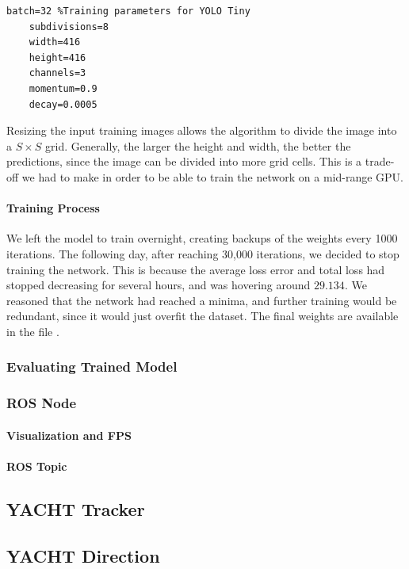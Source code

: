 \begin{lstlisting}[language=Mymatlab,caption={Training parameters}]
	batch=32 %Training parameters for YOLO Tiny
	subdivisions=8
	width=416
	height=416
	channels=3
	momentum=0.9
	decay=0.0005
\end{lstlisting}

Resizing the input training images allows the algorithm to divide the image into a $S\times S$ grid. Generally, the larger the height and width, the better the predictions, since the image can be divided into more grid cells. This is a trade-off we had to make in order to be able to train the network on a mid-range GPU.

\paragraph{Training Process} We left the model to train overnight, creating backups of the weights every 1000 iterations. The following day, after reaching 30,000 iterations, we decided to stop training the network. This is because the average loss error and total loss had stopped decreasing for several hours, and was hovering around $29.134$. We reasoned that the network had reached a minima, and further training would be redundant, since it would just overfit the dataset. The final weights are available in the file  .

\subsubsection{Evaluating Trained Model}


\subsubsection{ROS Node}

\paragraph{Visualization and FPS}

\paragraph{ROS Topic}


\subsection{YACHT Tracker}


\subsection{YACHT Direction}




%
